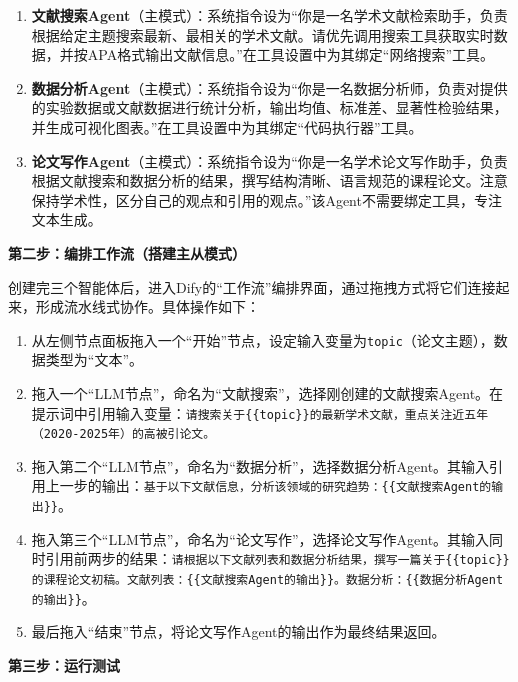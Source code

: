 \begin{enumerate}
\item \textbf{文献搜索Agent}（主模式）：系统指令设为“你是一名学术文献检索助手，负责根据给定主题搜索最新、最相关的学术文献。请优先调用搜索工具获取实时数据，并按APA格式输出文献信息。”在工具设置中为其绑定“网络搜索”工具。

\item \textbf{数据分析Agent}（主模式）：系统指令设为“你是一名数据分析师，负责对提供的实验数据或文献数据进行统计分析，输出均值、标准差、显著性检验结果，并生成可视化图表。”在工具设置中为其绑定“代码执行器”工具。

\item \textbf{论文写作Agent}（主模式）：系统指令设为“你是一名学术论文写作助手，负责根据文献搜索和数据分析的结果，撰写结构清晰、语言规范的课程论文。注意保持学术性，区分自己的观点和引用的观点。”该Agent不需要绑定工具，专注文本生成。
\end{enumerate}

\textbf{第二步：编排工作流（搭建主从模式）}

创建完三个智能体后，进入Dify的“工作流”编排界面，通过拖拽方式将它们连接起来，形成流水线式协作。具体操作如下：

\begin{enumerate}
\item 从左侧节点面板拖入一个“开始”节点，设定输入变量为\texttt{topic}（论文主题），数据类型为“文本”。

\item 拖入一个“LLM节点”，命名为“文献搜索”，选择刚创建的文献搜索Agent。在提示词中引用输入变量：\texttt{请搜索关于\{\{topic\}\}的最新学术文献，重点关注近五年（2020-2025年）的高被引论文。}

\item 拖入第二个“LLM节点”，命名为“数据分析”，选择数据分析Agent。其输入引用上一步的输出：\texttt{基于以下文献信息，分析该领域的研究趋势：\{\{文献搜索Agent的输出\}\}}。

\item 拖入第三个“LLM节点”，命名为“论文写作”，选择论文写作Agent。其输入同时引用前两步的结果：\texttt{请根据以下文献列表和数据分析结果，撰写一篇关于\{\{topic\}\}的课程论文初稿。文献列表：\{\{文献搜索Agent的输出\}\}。数据分析：\{\{数据分析Agent的输出\}\}}。

\item 最后拖入“结束”节点，将论文写作Agent的输出作为最终结果返回。
\end{enumerate}

\textbf{第三步：运行测试}

